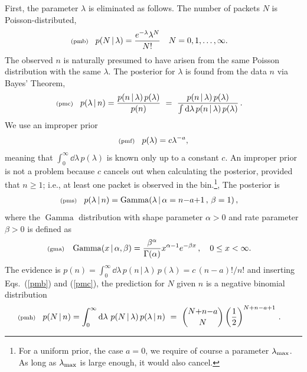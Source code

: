 \documentclass[11pt]{article}
\newcommand{\lleq}[1]{\label{#1} }
\renewcommand{\lleq}[1]{\label{#1} {\scriptstyle {\rm (#1)}} \hspace*{2ex} }
\newcommand{\cond}{\,|\,}
\DeclareMathOperator{\GammaDist}{Gamma}
\newcommand{\rmdx}[1]{\dd{#1}} %
\begin{document}
First, the parameter $\lambda$ is eliminated as follows. The number of
packets $N$ is Poisson-distributed,
\begin{align}
  \lleq{pmb}
  p(N\cond\lambda) &= \frac{e^{-\lambda}\lambda^{N}}{N!}
  \quad N = 0,1,\ldots,\infty.
\end{align}
The observed $n$ is naturally presumed to have arisen from the same
Poisson distribution with the same $\lambda$.  The posterior for
$\lambda$ is found from the data $n$ via Bayes' Theorem,
\begin{align}
  \lleq{pmc}
  p(\lambda\cond n) %
  &= \frac{p(n\cond\lambda)\,p(\lambda)} {p(n)}
  \ =\ \frac{p(n\cond\lambda)\,p(\lambda)} %
  {\int \rmdx{\lambda} p(n\cond\lambda)\,p(\lambda)} \,.
\end{align}
We use an improper prior
\begin{align}
  \lleq{pmf}
  p(\lambda) = c \lambda^{-a},
\end{align}
meaning that $\int_0^\infty \rmdx{\lambda}\,p(\lambda)$ is known only up to
a constant $c$. An improper prior is not
a problem because $c$ cancels out when calculating the posterior,
provided that $n \ge 1$; i.e., at least one packet is observed in the
bin.\footnote{For a uniform prior, the case $a{=}0$, we require of
  course a parameter $\lambda_{\rm max}$. As long as
  $\lambda_{\rm max}$ is large enough, it would also cancel.}, The
posterior is
\begin{align}
  \lleq{pms}
  p(\lambda\cond n)
  &= \GammaDist(\lambda \cond \alpha = n{-}a{+}1 \,,\, \beta = 1)\,,
\end{align}
where the $\GammaDist$ distribution with shape parameter $\alpha > 0$ and
rate parameter $\beta > 0$ is defined as
\begin{align}
  \lleq{gma}
  \GammaDist(x\cond \alpha, \beta)
  &= \frac{\beta^\alpha}{\Gamma(\alpha)} x^{\alpha-1} e^{-\beta x}\,,
  \quad 0 \leq x < \infty.
\end{align}
The evidence is
$p(n) =  \int_0^\infty \rmdx{\lambda}\, p(n\cond\lambda)\,p(\lambda) = c\,(n-a)!/n!$
and inserting Eqs.~(\ref{pmb}) and (\ref{pmc}), the prediction for $N$
given $n$ is a negative binomial distribution
\begin{align}
  \lleq{pmh}
  p(N\cond n) %
  &= \int_0^\infty \rmdx{\lambda}\, p(N\cond\lambda)\,p(\lambda\cond n)
  \ =\ \binom{N{+}n{-}a}{N} \left(\frac{1}{2}\right)^{N+n-a+1}\, .
\end{align}
\end{document}
